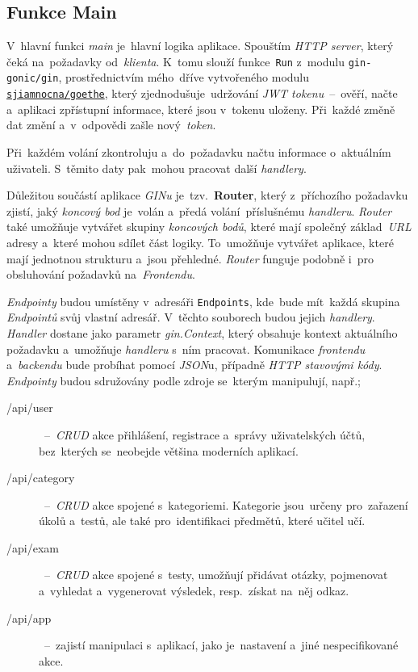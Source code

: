 \documentclass[11pt,a4paper]{report}
\begin{document}
        \subsection{Funkce Main}
            V~hlavní funkci \emph{main} je~hlavní logika aplikace. Spouštím \emph{HTTP server}, který čeká na~požadavky od~\emph{klienta}. K~tomu slouží funkce~\texttt{Run} z~modulu \texttt{gin-gonic/gin}, prostřednictvím mého~dříve vytvořeného modulu \href{https://gitlab.com/sjiamnocna/goethe}{\texttt{sjiamnocna/goethe}}, který zjednodušuje~udržování \emph{JWT tokenu}~--~ověří, načte a~aplikaci zpřístupní informace, které jsou v~tokenu uloženy. Při~každé změně dat změní a~v~odpovědi zašle nový~\emph{token}.
            
            Při~každém volání zkontroluju a~do~požadavku načtu informace o~aktuálním uživateli. S~těmito daty pak~mohou pracovat další \emph{handlery}.

            Důležitou součástí aplikace \emph{GINu} je~tzv.~\textbf{Router}, který z~příchozího požadavku zjistí, jaký \emph{koncový bod} je~volán a~předá volání~příslušnému \emph{handleru}. \emph{Router} také umožňuje vytvářet skupiny \emph{koncových bodů}, které mají společný základ~\emph{URL} adresy a~které mohou sdílet část logiky. To~umožňuje vytvářet aplikace, které mají jednotnou strukturu a~jsou přehledné. \emph{Router} funguje podobně i~pro obsluhování požadavků na~\emph{Frontendu}.

            \emph{Endpointy} budou umístěny v~adresáři \texttt{Endpoints}, kde~bude mít~každá skupina \emph{Endpointů} svůj vlastní adresář. V~těchto souborech budou jejich \emph{handlery}. \emph{Handler} dostane jako parametr \emph{gin.Context}, který obsahuje kontext aktuálního požadavku a~umožňuje \emph{handleru} s~ním pracovat. Komunikace \emph{frontendu} a~\emph{backendu} bude probíhat pomocí \emph{JSON}u, případně \emph{HTTP stavovými kódy}. \emph{Endpointy} budou sdružovány podle zdroje se~kterým manipulují, např.;
            \begin{description}
                \item[/api/user]~--~\emph{CRUD} akce přihlášení, registrace a~správy uživatelských účtů, bez~kterých se~neobejde většina moderních aplikací.
                \item[/api/category]~--~\emph{CRUD} akce spojené s~kategoriemi. Kategorie jsou~určeny pro~zařazení úkolů a~testů, ale také pro~identifikaci předmětů, které učitel učí.
                \item[/api/exam]~--~\emph{CRUD} akce spojené s~testy, umožňují přidávat otázky, pojmenovat a~vyhledat a~vygenerovat výsledek, resp.~získat na~něj odkaz.
                \item[/api/app]~--~zajistí manipulaci s~aplikací, jako je~nastavení a~jiné nespecifikované akce.
            \end{description}
\end{document}
